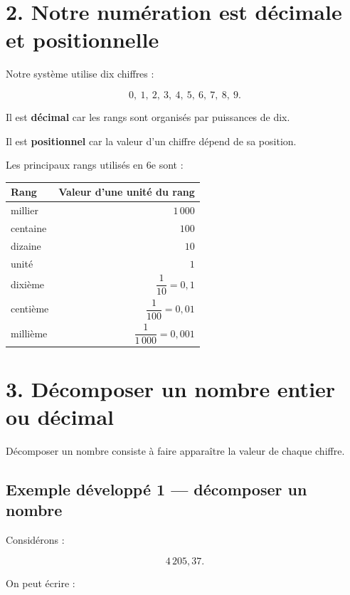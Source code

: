 \section{2. Notre numération est décimale et positionnelle}

Notre système utilise dix chiffres :

\[
0,\ 1,\ 2,\ 3,\ 4,\ 5,\ 6,\ 7,\ 8,\ 9.
\]

Il est \textbf{décimal} car les rangs sont organisés par puissances de dix.

Il est \textbf{positionnel} car la valeur d’un chiffre dépend de sa position.

Les principaux rangs utilisés en 6e sont :

\begin{tabular}{l r}
\textbf{Rang} & \textbf{Valeur d’une unité du rang} \\
\hline
millier & $1\,000$ \\
centaine & $100$ \\
dizaine & $10$ \\
unité & $1$ \\
dixième & $\dfrac{1}{10}=0{,}1$ \\
centième & $\dfrac{1}{100}=0{,}01$ \\
millième & $\dfrac{1}{1\,000}=0{,}001$ \\
\end{tabular}


\section{3. Décomposer un nombre entier ou décimal}

Décomposer un nombre consiste à faire apparaître la valeur de chaque chiffre.

\subsection{Exemple développé 1 — décomposer un nombre}

Considérons :

\[
4\,205{,}37.
\]

On peut écrire :

